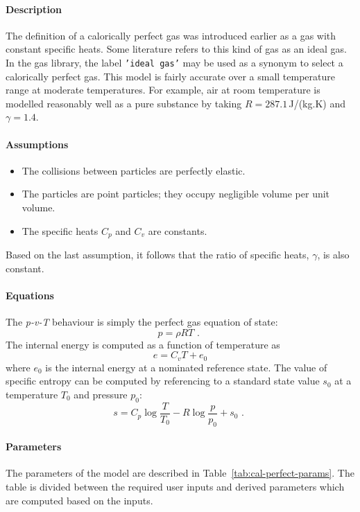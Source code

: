 \paragraph{Description}
The definition of a calorically perfect gas was introduced earlier as a gas with
constant specific heats.
Some literature refers to this kind of gas as an ideal gas.
In the gas library, the label \texttt{'ideal gas'} may be
used as a synonym to select a calorically perfect gas.
This model is fairly accurate over a small temperature range at moderate
temperatures.
For example, air at room temperature is modelled reasonably well as a pure substance
by taking $R = 287.1$\,J/(kg.K) and $\gamma = 1.4$.

\paragraph{Assumptions}
\begin{itemize}
\item The collisions between particles are perfectly elastic.
\item The particles are point particles; they occupy negligible volume per unit volume.
\item The specific heats $C_p$ and $C_v$ are constants.
\end{itemize}
Based on the last assumption, it follows that the ratio of specific heats, $\gamma$,
is also constant.

\paragraph{Equations}
The \textit{p-v-T} behaviour is simply the perfect gas equation of state:
\begin{equation}
 p = \rho R T \text{ . }
\end{equation}
The internal energy is computed as a function of temperature as
\begin{equation}
 e = C_v T + e_0
\end{equation}
where $e_0$ is the internal energy at a nominated reference state.
The value of specific entropy can be computed by referencing to
a standard state value $s_0$ at a temperature $T_0$ and pressure
$p_0$:
\begin{equation}
  s = C_p \log \frac{T}{T_0} - R \log \frac{p}{p_0} + s_0 \text{ . }
\end{equation}

\paragraph{Parameters}
The parameters of the model are described in Table~\ref{tab:cal-perfect-params}.
The table is divided between the required user inputs and derived parameters
which are computed based on the inputs.

